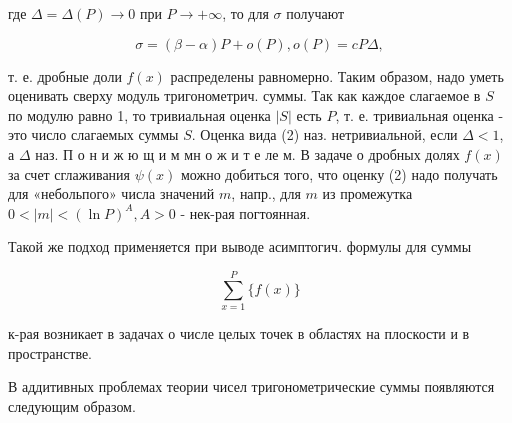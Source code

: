 \documentclass[10pt]{article}
\begin{document}
где $\Delta=\Delta(P) \rightarrow 0$ при $P \rightarrow+\infty$, то для $\sigma$ получают



\[

\sigma=(\beta-\alpha) P+o(P), o(P)=c P \Delta,

\]



т. е. дробные доли $f(x)$ распределены равномерно. Таким образом, надо уметь оценивать сверху модуль тригонометрич. суммы. Так как каждое слагаемое в $S$ по модулю равно 1, то тривиальная оценка $|S|$ есть $P$, т. е. тривиальная оценка - это число слагаемых суммы $S$. Оценка вида (2) наз. нетривиальной, если $\Delta<1$, а $\Delta$ наз. П о н и ж ю щ и м мн о ж и т е ле м. В задаче о дробных долях $f(x)$ за счет сглаживания $\psi(x)$ можно добиться того, что оценку (2) надо получать для «небольпого» числа значений $m$, напр., для $m$ из промежутка $0<|m|<(\ln P)^{A}, A>0$ - нек-рая погтоянная.



Такой же подход применяется при выводе асимптогич. формулы для суммы



\[

\sum_{x=1}^{P}\{f(x)\}

\]



к-рая возникает в задачах о числе целых точек в областях на плоскости и в пространстве.



В аддитивных проблемах теории чисел тригонометрические суммы появляются следующим образом.
\end{document}

